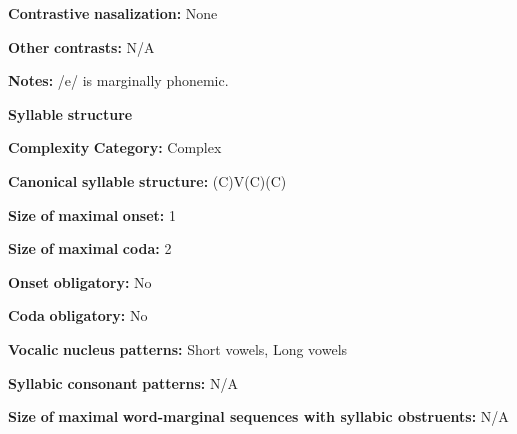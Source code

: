 \begin{styleBody}
\textbf{Contrastive} \textbf{nasalization:} None
\end{styleBody}

\begin{styleBody}
\textbf{Other} \textbf{contrasts:} N/A
\end{styleBody}

\begin{styleBody}
\textbf{Notes:} /e/ is marginally phonemic.
\end{styleBody}

\begin{styleBody}
\textbf{Syllable} \textbf{structure}
\end{styleBody}

\begin{styleBody}
\textbf{Complexity} \textbf{Category:} Complex
\end{styleBody}

\begin{styleBody}
\textbf{Canonical} \textbf{syllable} \textbf{structure:} (C)V(C)(C) \citep[94-104]{Bowern2012}
\end{styleBody}

\begin{styleBody}
\textbf{Size} \textbf{of} \textbf{maximal} \textbf{onset:} 1
\end{styleBody}

\begin{styleBody}
\textbf{Size} \textbf{of} \textbf{maximal} \textbf{coda:} 2
\end{styleBody}

\begin{styleBody}
\textbf{Onset} \textbf{obligatory:} No
\end{styleBody}

\begin{styleBody}
\textbf{Coda} \textbf{obligatory:} No
\end{styleBody}

\begin{styleBody}
\textbf{Vocalic} \textbf{nucleus} \textbf{patterns:} Short vowels, Long vowels
\end{styleBody}

\begin{styleBody}
\textbf{Syllabic} \textbf{consonant} \textbf{patterns:} N/A
\end{styleBody}

\begin{styleBody}
\textbf{Size} \textbf{of} \textbf{maximal} \textbf{word{}-marginal sequences with syllabic obstruents:} N/A
\end{styleBody}

